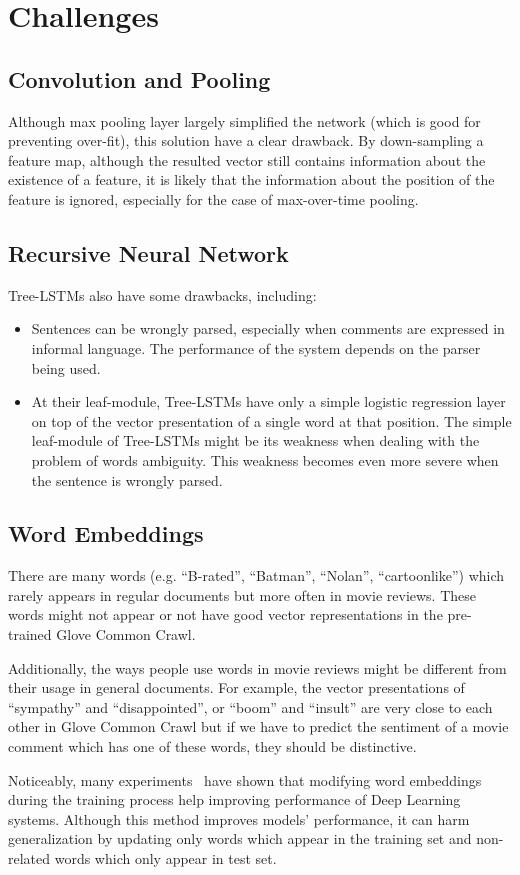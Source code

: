 \section{Challenges}
\subsection{Convolution and Pooling}\label{sec:cnn-weak}
Although max pooling layer largely simplified the network (which is good for preventing over-fit), this solution have a clear drawback.
By down-sampling a feature map, although the resulted vector still contains information about the existence of a feature, it is likely that the information about the position of the feature is ignored, especially for the case of max-over-time pooling.
\subsection{Recursive Neural Network}\label{sec:recursive-nn-weak}
Tree-LSTMs also have some drawbacks, including:
\begin{itemize}
	\item Sentences can be wrongly parsed, especially when comments are expressed in informal language.
	The performance of the system depends on the parser being used.
	\item At their leaf-module, Tree-LSTMs have only a simple logistic regression layer on top of the vector presentation of a single word at that position.
	The simple leaf-module of Tree-LSTMs might be its weakness when dealing with the problem of words ambiguity.
	This weakness becomes even more severe when the sentence is wrongly parsed. 
\end{itemize}
\subsection{Word Embeddings}\label{sec:word-weak}
There are many words (e.g. ``B-rated'', ``Batman'', ``Nolan'', ``cartoonlike'') which rarely appears in regular documents but more often in movie reviews.
These words might not appear or not have good vector representations in the pre-trained Glove Common Crawl.

Additionally, the ways people use words in movie reviews might be different from their usage in general documents.
For example, the vector presentations of ``sympathy'' and ``disappointed'', or ``boom'' and ``insult'' are very close to each other in Glove Common Crawl but if we have to predict the sentiment of a movie comment which has one of these words, they should be distinctive.

Noticeably, many experiments~\cite{treeLSTM, KimCNN} have shown that modifying word embeddings during the training process help improving performance of Deep Learning systems.
Although this method improves models' performance, it can harm generalization by updating only words which appear in the training set and non-related words which only appear in test set.